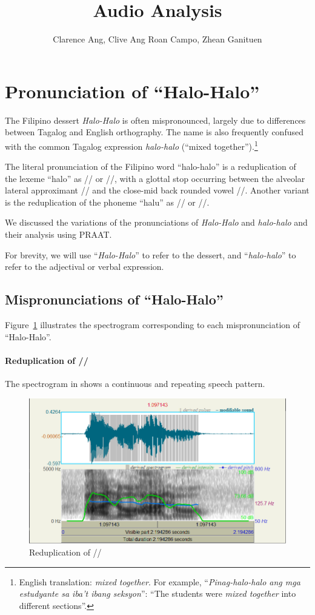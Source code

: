 \documentclass{article}
\title{Audio Analysis}
\author{   
	Clarence Ang,
	Clive Ang
	Roan Campo,
	Zhean Ganituen
}
\begin{document}
	\maketitle
	
	\section{Pronunciation of ``Halo-Halo''}
	
	The Filipino dessert \emph{Halo-Halo} is often mispronounced, largely due to
	differences between Tagalog and English orthography. The name is also
	frequently confused with the common Tagalog expression \emph{halo-halo}
	(``mixed together'').\footnote{English translation: \emph{mixed together}. For
		example, ``\emph{Pinag-halo-halo ang mga estudyante sa iba't ibang seksyon}'':
		``The students were \emph{mixed together} into different sections''.}
	
	The literal pronunciation of the Filipino word ``halo-halo'' is a reduplication
	of the lexeme ``halo'' as // or //, with a glottal
	stop occurring between the alveolar lateral approximant // and the
	close-mid back rounded vowel //. Another variant is the
	reduplication of the phoneme ``halu'' as // or //.
	
	We discussed the variations of the pronunciations of \emph{Halo-Halo} and
	\emph{halo-halo} and their analysis using PRAAT.
	
	For brevity, we will use ``\emph{Halo-Halo}'' to refer to the dessert, and
	``\emph{halo-halo}'' to refer to the adjectival or verbal expression.
	
	\subsection{Mispronunciations of ``Halo-Halo''}
	
	Figure~\ref{fig:halo} illustrates the spectrogram corresponding to each
	mispronunciation of ``Halo-Halo''.
	
	\paragraph{Reduplication of //} The spectrogram in
	 shows a continuous and repeating speech pattern.
	
	\begin{figure}
		\centering
		\includegraphics[width=0.65\linewidth]{img/halo.png}
		\caption{Reduplication of //}\label{fig:halo}
	\end{figure}
	
\end{document}
